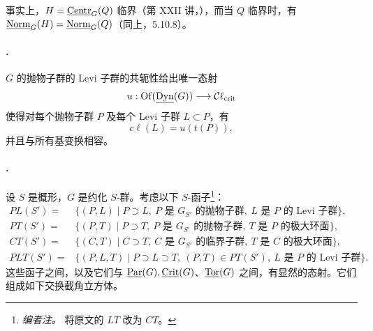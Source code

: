 事实上，\(H=\underline{\operatorname{Centr}}_G(Q)\) 临界（第 XXII 讲，），而当 \(Q\) 临界时，有 \(\underline{\operatorname{Norm}}_G(H)=\underline{\operatorname{Norm}}_G(Q)\)（同上，5.10.8）。

\paragraph{.}
\(G\) 的抛物子群的 Levi 子群的共轭性给出唯一态射
\[
 u:\operatorname{Of}(\underline{\operatorname{Dyn}}(G))
 \longrightarrow\mathcal C\ell_{\mathrm{crit}}
\]
使得对每个抛物子群 \(P\) 及每个 Levi 子群 \(L\subset P\)，有
\[
 c\ell(L)=u(t(P)),
\]
并且与所有基变换相容。

\paragraph{.}
设 \(S\) 是概形，\(G\) 是约化 \(S\)-群。考虑以下 \(S\)-函子\footnote{\emph{编者注。} 将原文的 \(LT\) 改为 \(CT\)。}：
\[
\begin{aligned}
 PL(S')={}&\{(P,L)\mid P\supset L,\ P\text{ 是 }G_{S'}\text{ 的抛物子群},\
                    L\text{ 是 }P\text{ 的 Levi 子群}\},\\
 PT(S')={}&\{(P,T)\mid P\supset T,\ P\text{ 是 }G_{S'}\text{ 的抛物子群},\
                    T\text{ 是 }P\text{ 的极大环面}\},\\
 CT(S')={}&\{(C,T)\mid C\supset T,\ C\text{ 是 }G_{S'}\text{ 的临界子群},\
                    T\text{ 是 }C\text{ 的极大环面}\},\\
 PLT(S')={}&\{(P,L,T)\mid P\supset L\supset T,\ (P,T)\in PT(S'),\
                    L\text{ 是 }P\text{ 的 Levi 子群}\}.
\end{aligned}
\]
这些函子之间，以及它们与 \(\underline{\operatorname{Par}}(G),\underline{\operatorname{Crit}}(G)\)、\(\underline{\operatorname{Tor}}(G)\) 之间，有显然的态射。它们组成如下交换截角立方体。
